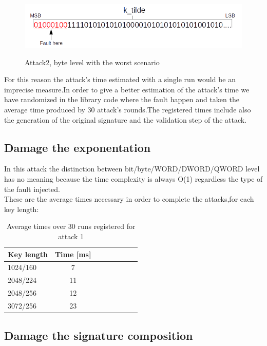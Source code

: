 \documentclass[11pt,english]{article}
\begin{document}
\begin{figure}[H]
\includegraphics[width=1.0\textwidth]{img/attack2byteworst.png} \\
\caption{\label{f_etichetta}Attack2, byte level with the worst scenario }
\end{figure}

For this reason the attack's time estimated with a single run would be an imprecise measure.In order to give a better estimation of the attack's time we have randomized in the library code where the fault happen and taken the average time produced by 30 attack's rounds.The registered times include also the generation of the original signature and the validation step of the attack.

\subsection{Damage the exponentation}

In this attack the distinction between bit/byte/WORD/DWORD/QWORD level has no meaning because the time complexity is always O(1) regardless the type of the fault injected. 
\\
These are the average times necessary in order to complete the attacks,for each key length:


\begin{table}[H]
\caption{ Average times over 30 runs registered for attack 1 }
\begin{center}
\begin{tabular}{l*{6}{c}r}
Key length        & Time [ms] \\
\hline
1024/160 &       7 \\
2048/224 &       11  \\
2048/256 &       12  \\
3072/256 &       23  \\ 
\end{tabular}
\end{center}
\end{table}



\subsection{Damage the signature composition}
\end{document}
